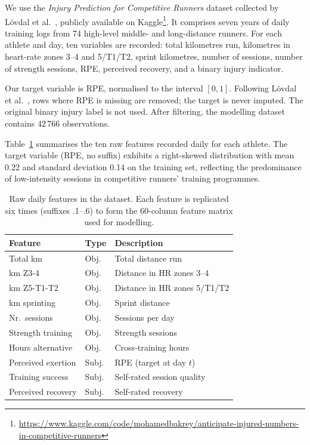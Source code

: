 \documentclass[10pt, twocolumn]{article}
\begin{document}
We use the \emph{Injury Prediction for Competitive Runners} dataset
collected by L{\"o}vdal et al.~\cite{lovdal2021}, publicly available on
Kaggle\footnote{\url{https://www.kaggle.com/code/mohamedbakrey/anticipate-injured-numbers-in-competitive-runners}}.
It comprises seven years of daily training logs from 74 high-level middle- and
long-distance runners. For each athlete and day, ten variables are recorded:
total kilometres run, kilometres in heart-rate zones 3--4 and 5/T1/T2,
sprint kilometres, number of sessions, number of strength sessions, RPE,
perceived recovery, and a binary injury indicator.

Our target variable is RPE, normalised to the interval $[0, 1]$. Following
L{\"o}vdal et al.~\cite{lovdal2021}, rows where RPE is missing are removed; the target is
never imputed. The original binary injury label is not used. After filtering,
the modelling dataset contains 42\,766 observations.

Table~\ref{tab:features} summarises the ten raw features recorded
daily for each athlete. The target variable (RPE, no suffix) exhibits
a right-skewed distribution with mean 0.22 and standard deviation 0.14
on the training set, reflecting the predominance of low-intensity
sessions in competitive runners' training programmes.

\begin{table}[!htb]
  \centering
  \small
  \caption{Raw daily features in the dataset. Each feature is
           replicated six times (suffixes .1--.6) to form the
           60-column feature matrix used for modelling.}
  \label{tab:features}
  \begin{tabular}{@{}llp{3.8cm}@{}}
    \toprule
    Feature & Type & Description \\
    \midrule
    Total km           & Obj. & Total distance run \\
    km Z3-4            & Obj. & Distance in HR zones 3--4 \\
    km Z5-T1-T2        & Obj. & Distance in HR zones 5/T1/T2 \\
    km sprinting       & Obj. & Sprint distance \\
    Nr.\ sessions      & Obj. & Sessions per day \\
    Strength training  & Obj. & Strength sessions \\
    Hours alternative  & Obj. & Cross-training hours \\
    Perceived exertion & Subj. & RPE (target at day $t$) \\
    Training success   & Subj. & Self-rated session quality \\
    Perceived recovery & Subj. & Self-rated recovery \\
    \bottomrule
  \end{tabular}
\end{table}
\end{document}
